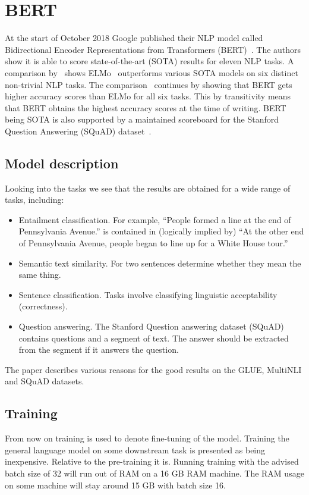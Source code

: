 \section{BERT}
\label{sec:bert}
At the start of October 2018 Google published their NLP model called Bidirectional Encoder Representations from Transformers (BERT)~\citep{devlin2018}.
The authors show it is able to score state-of-the-art (SOTA) results for eleven NLP tasks.
A comparison by~\citet{young2018recent} shows ELMo~\citep{peters2018} outperforms various SOTA models on six distinct non-trivial NLP tasks.
The comparison~\citep{young2018recent} continues by showing that BERT gets higher accuracy scores than ELMo for all six tasks.
This by transitivity means that BERT obtains the highest accuracy scores at the time of writing.
BERT being SOTA is also supported by a maintained scoreboard for the Stanford Question Answering (SQuAD) dataset~\citep{rajpurkar2019explorer}.

\subsection{Model description}
\label{subsec:model_description}
Looking into the tasks we see that the results are obtained for a wide range of tasks, including:
\begin{itemize}
    \item Entailment classification.
    For example, ``People formed a line at the end of Pennsylvania Avenue.''
    is contained in (logically implied by) ``At the other end of Pennsylvania Avenue, people began to line up for a White House tour.''~\cite{williams2018}
    \item Semantic text similarity.
    For two sentences determine whether they mean the same thing.
    \item Sentence classification.
    Tasks involve classifying linguistic acceptability (correctness).
    \item Question answering.
    The Stanford Question answering dataset (SQuAD)~\cite{rajpurkar2018} contains questions and a segment of text.
    The answer should be extracted from the segment if it answers the question.
\end{itemize}

The paper describes various reasons for the good results on the GLUE, MultiNLI and SQuAD datasets.


\subsection{Training}
\label{subsec:training}
From now on training is used to denote fine-tuning of the model.
Training the general language model on some downstream task is presented as being inexpensive.
Relative to the pre-training it is.
Running training with the advised batch size of 32 will run out of RAM on a 16 GB RAM machine.
The RAM usage on some machine will stay around 15 GB with batch size 16.

